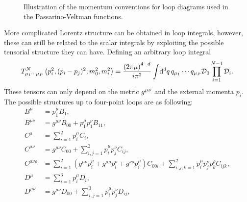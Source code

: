 \documentclass[../main.tex]{subfiles}
\begin{document}
\begin{donotread}
  \begin{figure}[ht!]
    \centering
    \begin{subfigure}{0.49\linewidth}
      \centering
      \caption{}
      \label{qft:fig:PV_triloop_conventions}
    \end{subfigure}
    \begin{subfigure}{0.49\linewidth}
      \centering
      \caption{}
      \label{qft:fig:PV_boxloop_conventions}
    \end{subfigure}
    \caption{Illustration of the momentum conventions for loop diagrams used in
      the Passarino-Veltman functions.}
    \label{qft:fig:PV_loop_conventions}
  \end{figure}

  More complicated Lorentz structure can be obtained in loop integrals, however,
  these can still be related to the scalar integrals by exploiting the possible
  tensorial structure they can have. Defining an arbitrary loop integral
  \begin{equation}
    T^N_{\mu_1\cdots\mu_P}\left(p_i^2, (p_i-p_j)^2; m_0^2, m_i^2\right) =
    \frac{\left(2\pi \mu\right)^{4-d}}{i \pi^2} \int \!\mathrm{d}^d q\, q_{\mu_1}\cdots
    q_{\mu_P} \mathcal{D}_0 \prod_{i=1}^{N-1} \mathcal{D}_i.
  \end{equation}
  These tensors can only depend on the metric \(\tensor{g}{^\mu^\nu}\) and the
  external momenta \(p_i\).
  The possible structures up to four-point loops are as following:
  \begin{subequations}
    \begin{align}
      B^\mu                & = p_1^\mu B_1,
      \\
      B^{\mu\nu}           & = g^{\mu\nu} B_{00} + p_1^\mu p_1^\nu B_{11},
      \\
      C^\mu                & = \sum_{i=1}^2 p_i^\mu C_i,
      \\
      C^{\mu\nu}           & = g^{\mu\nu} C_{00} + \sum_{i,j=1}^{2} p_i^\mu
      p_j^\nu C_{ij},
      \\
      C^{\mu\nu\rho}       & = \sum_{i=1}^2 (g^{\mu\nu} p_i^{\rho} +
      g^{\mu\rho} p_i^{\nu} + g^{\nu\rho} p_i^{\mu}) C_{00i} +
      \sum_{i,j,k=1}^2
      p_i^\mu p_j^\nu p_k^\rho C_{ijk},
      \\
      D^\mu                & = \sum_{i=1}^3 p_i^\mu D_i,
      \\
      D^{\mu\nu}           & = g^{\mu\nu} D_{00} + \sum_{i,j=1}^{3} p_i^\mu
      p_j^\nu D_{ij},
      \\

\end{align}
\end{subequations}
\end{donotread}
\end{document}
